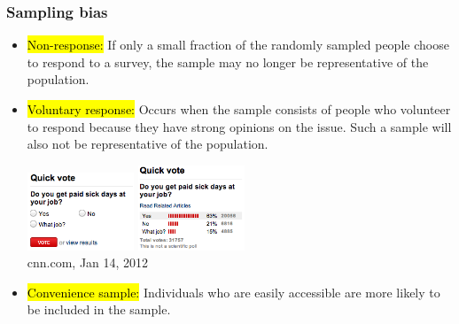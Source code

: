 \begin{frame}
\frametitle{Sampling bias}

\begin{itemize}

\item \hl{Non-response:} If only a small fraction of the randomly sampled people choose to respond to a survey, the sample may no longer be representative of the population.

\pause

\item \hl{Voluntary response:} Occurs when the sample consists of people who volunteer to respond because they have strong opinions on the issue. Such a sample will also not be representative of the population.

\pause

\begin{center}
\includegraphics[width=0.25\textwidth]{1-3_data_collection_principles/figures/vol_resp_bias/vol_resp_bias_q}\pause
\includegraphics[width=0.25\textwidth]{1-3_data_collection_principles/figures/vol_resp_bias/vol_resp_bias_res} \\
{\tiny cnn.com, Jan 14, 2012}
\end{center}

\pause

\item \hl{Convenience sample:} Individuals who are easily accessible are more likely to be included in the sample.

\end{itemize}

\end{frame}


